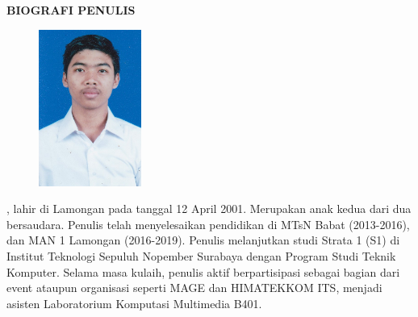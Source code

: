 \begin{center}
  \Large
  \textbf{BIOGRAFI PENULIS}
\end{center}


\vspace{2ex}

\begin{figure}
  \centering
  \vspace{-3ex}
  \includegraphics[width=0.3\textwidth]{gambar/alfan.jpg}
  \vspace{-4ex}
\end{figure}

\name{}, lahir di Lamongan pada tanggal 12 April 2001. Merupakan anak kedua dari dua bersaudara. Penulis telah menyelesaikan pendidikan di MTsN Babat (2013-2016), dan MAN 1 Lamongan (2016-2019). Penulis melanjutkan studi Strata 1 (S1) di Institut Teknologi Sepuluh Nopember Surabaya dengan Program Studi Teknik Komputer. Selama masa kulaih, penulis aktif berpartisipasi sebagai bagian dari event ataupun organisasi seperti MAGE dan HIMATEKKOM ITS, menjadi asisten Laboratorium Komputasi Multimedia B401.
